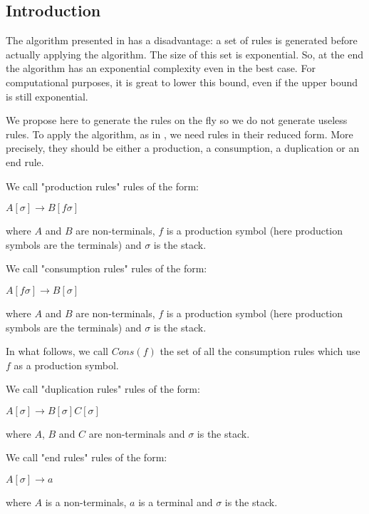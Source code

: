 \documentclass[10pt,a4paper,draft]{article}
\begin{document}
\subsection{Introduction}
\label{introAlgo}

The algorithm presented in \cite{aho68} has a disadvantage: a set of rules is generated before actually applying the algorithm. The size of this set is exponential. So, at the end the algorithm has an exponential complexity even in the best case. For computational purposes, it is great to lower this bound, even if the upper bound is still exponential.

We propose here to generate the rules on the fly so we do not generate useless rules. To apply the algorithm, as in \cite{aho68}, we need rules in their reduced form. More precisely, they should be either a production, a consumption, a duplication or an end rule.

\begin{definition}
We call "production rules" rules of the form:

$A[\sigma] \rightarrow B[f \sigma]$

where $A$ and $B$ are non-terminals, $f$ is a production symbol (here production symbols are the terminals) and $\sigma$ is the stack.
\end{definition}

\begin{definition}
We call "consumption rules" rules of the form:

$A[f \sigma] \rightarrow B[\sigma]$

where $A$ and $B$ are non-terminals, $f$ is a production symbol (here production symbols are the terminals) and $\sigma$ is the stack.

In what follows, we call $Cons(f)$ the set of all the consumption rules which use $f$ as a production symbol.
\end{definition}

\begin{definition}
We call "duplication rules" rules of the form:

$A[\sigma] \rightarrow B[\sigma] C[\sigma]$

where $A$, $B$ and $C$ are non-terminals and $\sigma$ is the stack.
\end{definition}

\begin{definition}
We call "end rules" rules of the form:

$A[\sigma] \rightarrow a$

where $A$ is a non-terminals, $a$ is a terminal and $\sigma$ is the stack.
\end{definition}
\end{document}
